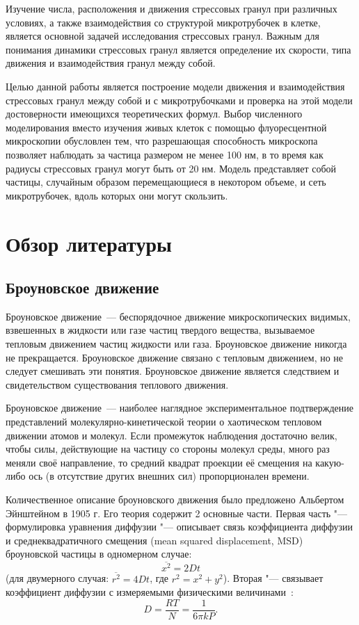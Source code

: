 \documentclass[14pt,a4paper]{extarticle}
\begin{document}
	 Изучение числа, расположения и движения стрессовых гранул при различных условиях, а также взаимодействия со структурой микротрубочек в клетке, является основной задачей исследования стрессовых гранул. Важным для понимания динамики стрессовых гранул является определение их скорости, типа движения и взаимодействия гранул между собой.
	 
	 Целью данной работы является построение модели движения и взаимодействия стрессовых гранул между собой и с микротрубочками и проверка на этой модели достоверности имеющихся теоретических формул. Выбор численного моделирования вместо изучения живых клеток с помощью флуоресцентной микроскопии обусловлен тем, что разрешающая способность микроскопа позволяет наблюдать за частица размером не менее 100 нм, в то время как радиусы стрессовых гранул могут быть от 20 нм. Модель представляет собой частицы, случайным образом перемещающиеся в некотором объеме, и сеть микротрубочек, вдоль которых они могут скользить.



\section{Обзор литературы} %

 \subsection{Броуновское движение}
	 Броуновское движение~--- беспорядочное движение микроскопических видимых, взвешенных в жидкости или газе частиц твердого вещества, вызываемое тепловым движением частиц жидкости или газа. Броуновское движение никогда не прекращается. Броуновское движение связано с тепловым движением, но не следует смешивать эти понятия. Броуновское движение является следствием и свидетельством существования теплового движения.
	 
	 Броуновское движение~--- наиболее наглядное экспериментальное подтверждение представлений молекулярно-кинетической теории о хаотическом тепловом движении атомов и молекул. Если промежуток наблюдения достаточно велик, чтобы силы, действующие на частицу со стороны молекул среды, много раз меняли своё направление, то средний квадрат проекции её смещения на какую-либо ось (в отсутствие других внешних сил) пропорционален времени.
	 
	 Количественное описание броуновского движения было предложено Альбертом Эйнштейном в 1905 г. Его теория содержит 2 основные части. Первая часть "--- формулировка уравнения диффузии "--- описывает связь коэффициента диффузии и среднеквадратичного смещения (mean squared displacement, MSD) броуновской частицы в одномерном случае: 
\begin{equation}
\overline{x^2} = 2Dt
\end{equation}
(для двумерного случая: $\overline{r^2} = 4Dt$, где $r^2 = x^2 + y^2$). Вторая "--- связывает коэффициент диффузии с измеряемыми физическими величинами~\cite{Einstein:1905ys}:
\begin{equation}
D = \frac{RT}{N} = \frac{1}{6\pi kP}.
\end{equation}
\end{document}
